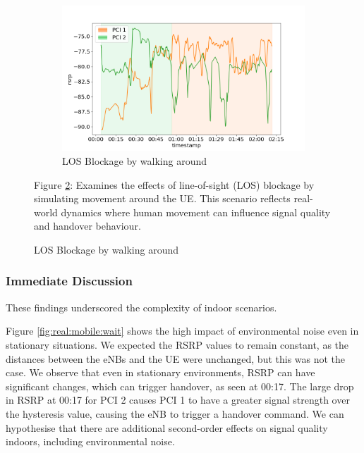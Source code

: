 \begin{figure}[p]
    \vspace{1cm}
    \begin{minipage}{0.45\textwidth}
    \begin{subfigure}{\linewidth}
        \centering
        \includegraphics[width=0.9\linewidth]{src//img/real_mobile_3.png}
        \caption{LOS Blockage by walking around}
        \label{fig:real:mobile:block}
    \end{subfigure}
    \end{minipage}
    \begin{minipage}{0.45\textwidth}
        \small{Figure \ref{fig:real:mobile:block}: Examines the effects of line-of-sight (LOS) blockage by simulating movement around the UE. This scenario reflects real-world dynamics where human movement can influence signal quality and handover behaviour.}
    \end{minipage}
\end{figure}
\subsubsection{Immediate Discussion}
These findings underscored the complexity of indoor scenarios.

Figure \ref{fig:real:mobile:wait} shows the high impact of environmental noise even in stationary situations. We expected the RSRP values to remain constant, as the distances between the eNBs and the UE were unchanged, but this was not the case. We observe that even in stationary environments, RSRP can have significant changes, which can trigger handover, as seen at 00:17. The large drop in RSRP at 00:17 for PCI 2 causes PCI 1 to have a greater signal strength over the hysteresis value, causing the eNB to trigger a handover command. We can hypothesise that there are additional second-order effects on signal quality indoors, including environmental noise. 


